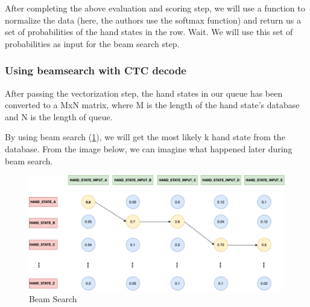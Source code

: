 After completing the above evaluation and scoring step, we will use a function to normalize the data (here, the authors use the softmax function) and return us a set of probabilities of the hand states in the row. Wait. We will use this set of probabilities as input for the beam search step.

\subsubsection{ Using beamsearch with CTC decode }

After passing the vectorization step, the hand states in our queue has been converted to a MxN matrix, where M is the length of the hand state's database and N is the length of queue.

By using beam search (\ref{fig:Chap4-BeamSearch}), we will get the most likely k hand state from the database. From the image below, we can imagine what happened later during beam search.

      


\begin{figure}[H]
  \centering
  \includegraphics[width=\textwidth]{img/Chap4/BeamSearch.png}
  \caption{ Beam Search }
  \label{fig:Chap4-BeamSearch}
\end{figure}

